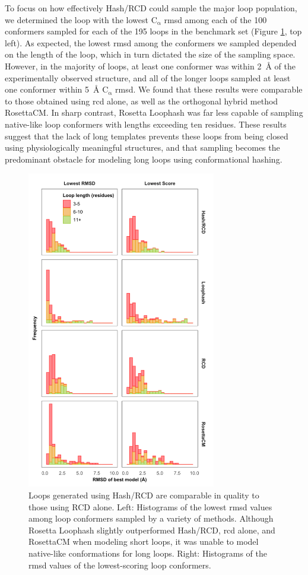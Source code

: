 To focus on how effectively Hash/RCD could sample the major loop population, we determined the loop with the lowest $\mathrm{C_{\upalpha}}$ \gls{rmsd} among each of the 100 conformers sampled for each of the 195 loops in the benchmark set (Figure \ref{fig:loophash_rmsd}, top left). As expected, the lowest \gls{rmsd} among the conformers we sampled depended on the length of the loop, which in turn dictated the size of the sampling space. However, in the majority of loops, at least one conformer was within \SI{2}{\angstrom} of the experimentally observed structure, and all of the longer loops sampled at least one conformer within \SI{5}{\angstrom} $\mathrm{C_{\upalpha}}$ \gls{rmsd}. We found that these results were comparable to those obtained using \gls{rcd} alone, as well as the orthogonal hybrid method RosettaCM. In sharp contrast, Rosetta Loophash was far less capable of sampling native-like loop conformers with lengths exceeding ten residues. These results suggest that the lack of long templates prevents these loops from being closed using physiologically meaningful structures, and that sampling becomes the predominant obstacle for modeling long loops using conformational hashing.
 
\begin{figure}[h!]
\centering
\includegraphics[width=3.25in]{Figures/loophash_rmsd.pdf}
 \caption[Loops generated using Hash/RCD are comparable in quality to those using RCD alone.]{Loops generated using Hash/RCD are comparable in quality to those using RCD alone. Left: Histograms of the lowest \gls{rmsd} values among loop conformers sampled by a variety of methods. Although Rosetta Loophash slightly outperformed Hash/RCD, \gls{rcd} alone, and RosettaCM when modeling short loops, it was unable to model native-like conformations for long loops. Right: Histograms of the \gls{rmsd} values of the lowest-scoring loop conformers.}
\label{fig:loophash_rmsd}
\end{figure}

